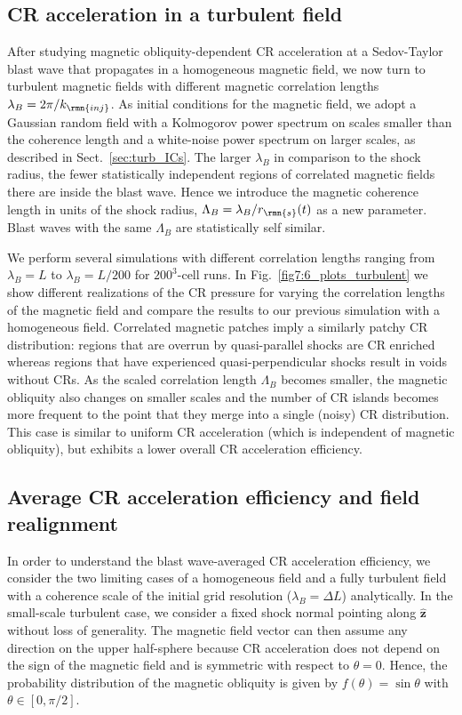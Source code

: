 \documentclass[8pt,a4paper,usenatbib]{mnras}
\begin{document}
\subsection{CR acceleration in a turbulent field}
\label{sec:turb}

After studying magnetic obliquity-dependent CR acceleration at a Sedov-Taylor
blast wave that propagates in a homogeneous magnetic field, we now turn to
turbulent magnetic fields with different magnetic correlation lengths
$\lambda_B=2\pi/k_{\rmn{inj}}$. As initial conditions for the magnetic field, we
adopt a Gaussian random field with a Kolmogorov power spectrum on scales smaller
than the coherence length and a white-noise power spectrum on larger scales, as
described in Sect.~\ref{sec:turb_ICs}.  The larger $\lambda_B$ in comparison to
the shock radius, the fewer statistically independent regions of correlated
magnetic fields there are inside the blast wave. Hence we introduce the magnetic
coherence length in units of the shock radius,
$\Lambda_B=\lambda_B/r_{\rmn{s}}(t)$ as a new parameter. Blast waves with
the same $\Lambda_B$ are statistically self similar.

We perform several simulations with different correlation lengths ranging from
$\lambda_B = L$ to $\lambda_B = L/200$ for $200^3$-cell runs.  In
Fig.~\ref{fig7:6_plots_turbulent} we show different realizations of the CR
pressure for varying the correlation lengths of the magnetic field and compare
the results to our previous simulation with a homogeneous field.  Correlated
magnetic patches imply a similarly patchy CR distribution: regions that are
overrun by quasi-parallel shocks are CR enriched whereas regions that have
experienced quasi-perpendicular shocks result in voids without CRs.  As the
scaled correlation length $\Lambda_B$ becomes smaller, the magnetic obliquity
also changes on smaller scales and the number of CR islands becomes more
frequent to the point that they merge into a single (noisy) CR distribution.
This case is similar to uniform CR acceleration (which is independent of
magnetic obliquity), but exhibits a lower overall CR acceleration efficiency.


\subsection{Average CR acceleration efficiency and field realignment}

In order to understand the blast wave-averaged CR acceleration efficiency, we
consider the two limiting cases of a homogeneous field and a fully turbulent
field with a coherence scale of the initial grid resolution ($\lambda_B = \Delta
L$) analytically. In the small-scale turbulent case, we consider a fixed shock
normal pointing along $\bm{\hat{z}}$ without loss of generality. The magnetic
field vector can then assume any direction on the upper half-sphere because CR
acceleration does not depend on the sign of the magnetic field and is symmetric
with respect to $\theta=0$. Hence, the probability distribution of the magnetic
obliquity is given by $f(\theta)=\sin\theta$ with
$\theta\in[0,\pi/2]$. 
\end{document}
